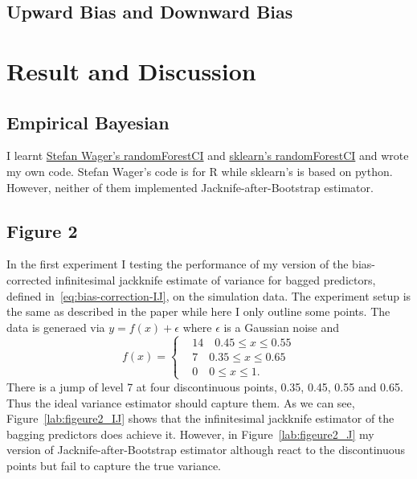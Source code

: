 \documentclass[11pt]{article}
\begin{document}
\subsection{Upward Bias and Downward Bias}

\section{Result and Discussion}
\subsection{Empirical Bayesian}
I learnt \href{https://github.com/swager/randomForestCI}{Stefan Wager's randomForestCI} and \href{https://github.com/scikit-learn-contrib/forest-confidence-interval}{sklearn's randomForestCI} and wrote my own code.
Stefan Wager's code is for R while sklearn's is based on python. 
However, neither of them implemented Jacknife-after-Bootstrap estimator.

\subsection{Figure 2}
In the first experiment I testing the performance of my version of the bias-corrected infinitesimal jackknife estimate of variance for bagged predictors, defined in~\ref{eq:bias-correction-IJ}, on the simulation data.
The experiment setup is the same as described in the paper while here I only outline some points.
The data is generaed via $y=f(x)+\epsilon$ where $\epsilon$ is a Gaussian noise and 
\begin{equation}
	f(x)=\left\{
	\begin{aligned}
	&14 \quad 0.45 \le x\le 0.55\\
	&7 \quad 0.35 \le x\le 0.65\\
	&0 \quad 0\le x\le 1.
	\end{aligned}
	\right
	.
\end{equation}
There is a jump of level 7 at four discontinuous points, 0.35, 0.45, 0.55 and 0.65. 
Thus the ideal variance estimator should capture them.
As we can see, Figure~\ref{lab:figeure2_IJ} shows that the infinitesimal jackknife estimator of the bagging predictors does achieve it.
However, in Figure~\ref{lab:figeure2_J} my version of Jacknife-after-Bootstrap estimator although react to the discontinuous points but fail to capture the true variance.
\end{document}
